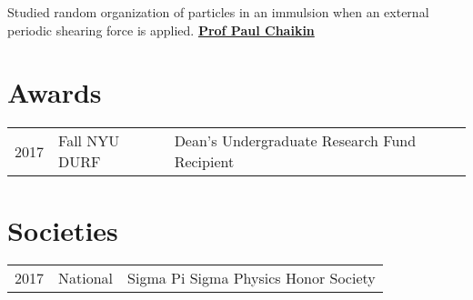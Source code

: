 \documentclass[]{deedy-resume-openfont}
\begin{document}
\begin{minipage}[t]{0.66\textwidth}
Studied random organization of particles in an immulsion when an external periodic shearing force is applied.
\textbf{\href{http://www.physics.nyu.edu/~pc86/people/chaikin.html}{Prof Paul Chaikin}} 
\sectionsep


\section{Awards} 
\begin{tabular}{rll}
2017	     & Fall NYU DURF  & Dean's Undergraduate Research Fund Recipient\\
\end{tabular}
\sectionsep


\section{Societies} 

\begin{tabular}{rll}
2017 	& National    & Sigma Pi Sigma Physics Honor Society\\
\end{tabular}
\sectionsep

\end{minipage} 
\end{document}
